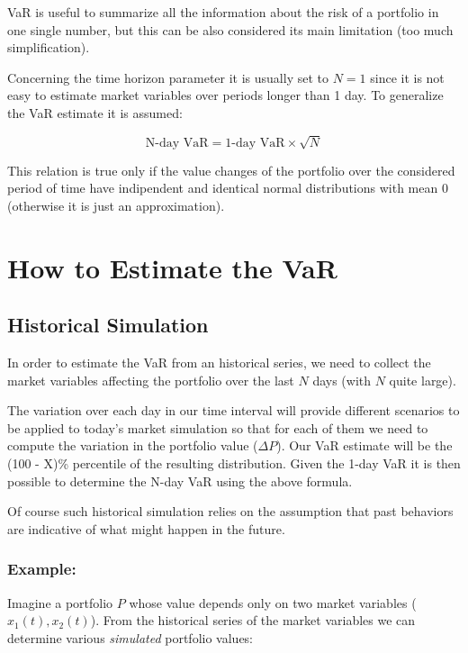     VaR is useful to summarize all the information about the risk of a
portfolio in one single number, but this can be also considered its main
limitation (too much simplification).

Concerning the time horizon parameter it is usually set to \(N=1\) since
it is not easy to estimate market variables over periods longer than 1
day. To generalize the VaR estimate it is assumed:

\[\textrm{N-day VaR} = \textrm{1-day VaR}\times \sqrt{N}\]

This relation is true only if the value changes of the portfolio over
the considered period of time have indipendent and identical normal
distributions with mean 0 (otherwise it is just an approximation).

\section{How to Estimate the VaR}\label{how-to-estimate-the-var}

\subsection{Historical Simulation}\label{historical-simulation}

In order to estimate the VaR from an historical series, we need to
collect the market variables affecting the portfolio over the last \(N\)
days (with \(N\) quite large).

The variation over each day in our time interval will provide different
scenarios to be applied to today's market simulation so that for each of
them we need to compute the variation in the portfolio value
(\(\Delta P\)). Our VaR estimate will be the (100 - X)\% percentile of
the resulting distribution. Given the 1-day VaR it is then possible to
determine the N-day VaR using the above formula.

Of course such historical simulation relies on the assumption that past
behaviors are indicative of what might happen in the future.

\subsubsection{Example:}\label{example}
Imagine a portfolio \(P\) whose value depends only on two market
variables (\(x_1(t) , x_2(t)\)). From the historical series of the
market variables we can determine various \emph{simulated} portfolio
values:

